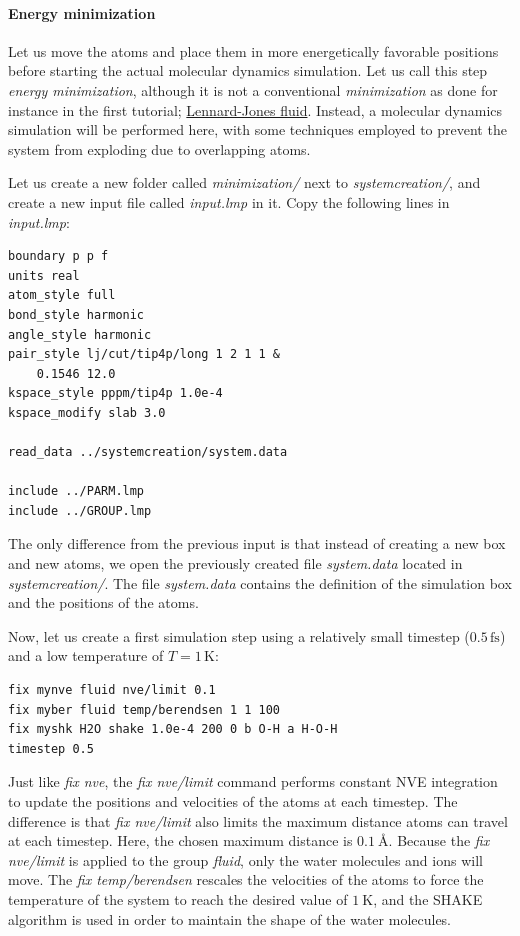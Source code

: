 \documentclass[9pt,tutorial]{livecoms}
\begin{document}
\paragraph{Energy minimization}
Let us move the atoms and place them in more energetically favorable positions
before starting the actual molecular dynamics simulation. Let us call this step
\textit{energy minimization}, although it is not a conventional \textit{minimization}
as done for instance in the first tutorial; \hyperref[lennard-jones-label]{Lennard-Jones fluid}.
Instead, a molecular dynamics simulation will be performed here, with some techniques
employed to prevent the system from exploding due to overlapping atoms.

Let us create a new folder called \textit{minimization/} next to \textit{systemcreation/},
and create a new input file called \textit{input.lmp} in it. Copy the following lines
in \textit{input.lmp}:
{\normalsize \begin{verbatim}
boundary p p f
units real
atom_style full
bond_style harmonic
angle_style harmonic
pair_style lj/cut/tip4p/long 1 2 1 1 &
    0.1546 12.0
kspace_style pppm/tip4p 1.0e-4
kspace_modify slab 3.0

read_data ../systemcreation/system.data

include ../PARM.lmp
include ../GROUP.lmp
\end{verbatim}}
The only difference from the previous input is that instead of creating a new
box and new atoms, we open the previously created file \textit{system.data}
located in \textit{systemcreation/}. The file \textit{system.data} contains the
definition of the simulation box and the positions of the atoms.

Now, let us create a first simulation step using a relatively small
timestep ($0.5\,\text{fs}$) and a low temperature of $T = 1\,\text{K}$:
{\normalsize \begin{verbatim}
fix mynve fluid nve/limit 0.1
fix myber fluid temp/berendsen 1 1 100
fix myshk H2O shake 1.0e-4 200 0 b O-H a H-O-H
timestep 0.5
\end{verbatim}}
Just like \textit{fix nve}, the \textit{fix nve/limit} command performs constant
NVE integration to update the positions and velocities of the atoms at each
timestep. The difference is that \textit{fix nve/limit} also limits the maximum
distance atoms can travel at each timestep. Here, the chosen maximum distance
is $0.1~\text{\AA{}}$. Because the \textit{fix nve/limit} is applied to the
group \textit{fluid}, only the water molecules and ions will move.
The \textit{fix temp/berendsen} rescales the velocities of the atoms to
force the temperature of the system to reach the desired value of $1~\text{K}$,
and the SHAKE algorithm is used in order to maintain the shape of the water molecules.
\end{document}
